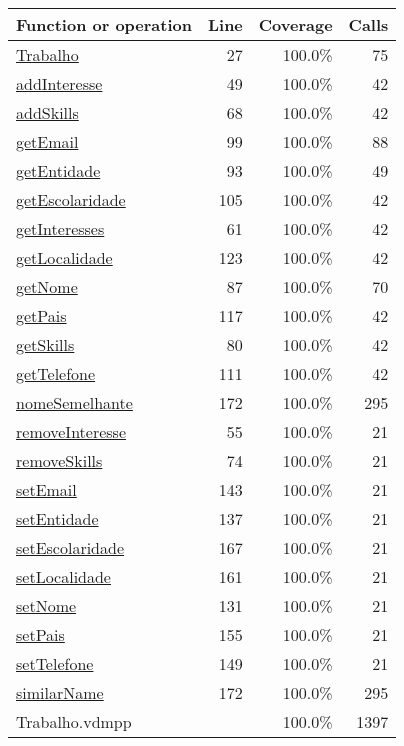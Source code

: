 \begin{longtable}{|l|r|r|r|}
\hline
Function or operation & Line & Coverage & Calls \\
\hline
\hline
\hyperref[Trabalho:27]{Trabalho} & 27&100.0\% & 75 \\
\hline
\hyperref[addInteresse:49]{addInteresse} & 49&100.0\% & 42 \\
\hline
\hyperref[addSkills:68]{addSkills} & 68&100.0\% & 42 \\
\hline
\hyperref[getEmail:99]{getEmail} & 99&100.0\% & 88 \\
\hline
\hyperref[getEntidade:93]{getEntidade} & 93&100.0\% & 49 \\
\hline
\hyperref[getEscolaridade:105]{getEscolaridade} & 105&100.0\% & 42 \\
\hline
\hyperref[getInteresses:61]{getInteresses} & 61&100.0\% & 42 \\
\hline
\hyperref[getLocalidade:123]{getLocalidade} & 123&100.0\% & 42 \\
\hline
\hyperref[getNome:87]{getNome} & 87&100.0\% & 70 \\
\hline
\hyperref[getPais:117]{getPais} & 117&100.0\% & 42 \\
\hline
\hyperref[getSkills:80]{getSkills} & 80&100.0\% & 42 \\
\hline
\hyperref[getTelefone:111]{getTelefone} & 111&100.0\% & 42 \\
\hline
\hyperref[nomeSemelhante:172]{nomeSemelhante} & 172&100.0\% & 295 \\
\hline
\hyperref[removeInteresse:55]{removeInteresse} & 55&100.0\% & 21 \\
\hline
\hyperref[removeSkills:74]{removeSkills} & 74&100.0\% & 21 \\
\hline
\hyperref[setEmail:143]{setEmail} & 143&100.0\% & 21 \\
\hline
\hyperref[setEntidade:137]{setEntidade} & 137&100.0\% & 21 \\
\hline
\hyperref[setEscolaridade:167]{setEscolaridade} & 167&100.0\% & 21 \\
\hline
\hyperref[setLocalidade:161]{setLocalidade} & 161&100.0\% & 21 \\
\hline
\hyperref[setNome:131]{setNome} & 131&100.0\% & 21 \\
\hline
\hyperref[setPais:155]{setPais} & 155&100.0\% & 21 \\
\hline
\hyperref[setTelefone:149]{setTelefone} & 149&100.0\% & 21 \\
\hline
\hyperref[similarName:172]{similarName} & 172&100.0\% & 295 \\
\hline
\hline
Trabalho.vdmpp & & 100.0\% & 1397 \\
\hline
\end{longtable}

